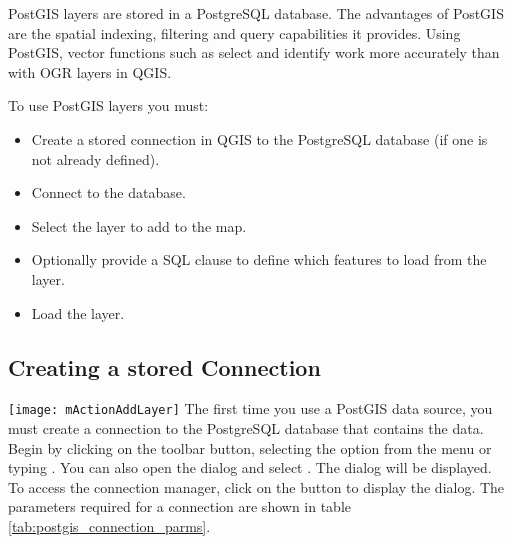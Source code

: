 PostGIS layers are stored in a PostgreSQL database. The advantages of PostGIS
are the spatial indexing, filtering and query capabilities it provides. Using PostGIS,
vector functions such as select and identify work more accurately than with
OGR layers in QGIS.

To use PostGIS layers you must:

\begin{itemize}
\item Create a stored connection in QGIS to the PostgreSQL database (if one is
not already defined).
\item Connect to the database.
\item Select the layer to add to the map.
\item Optionally provide a SQL 
clause to define which features
to load from the layer.
\item Load the layer.
\end{itemize}

\subsection{Creating a stored
Connection}\label{sec:postgis_stored}

\texttt{[image: mActionAddLayer]} The first time
you use a PostGIS data source, you must create a connection to the PostgreSQL
database that contains the data. Begin by clicking on the
 toolbar button, selecting the
 option from the
 menu or typing . You can also
open the  dialog and select .
The  dialog will
be displayed. To access the connection manager, click on the  button to display the  dialog. The parameters required for a connection are shown
in table \ref{tab:postgis_connection_parms}.

